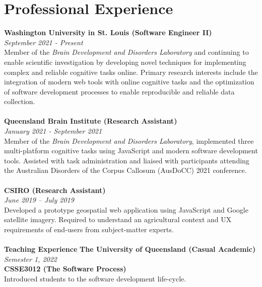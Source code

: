 \documentclass{article}
\begin{document}
  \section*{Professional Experience}
  \large\textbf{Washington University in St. Louis (Software Engineer II)} \\
  \textit{September 2021 - Present} \\
  Member of the \textit{Brain Development and Disorders Laboratory} and continuing to enable scientific investigation by developing novel techniques for implementing complex and reliable cognitive tasks online. Primary research interests include the integration of modern web tools with online cognitive tasks and the optimization of software development processes to enable reproducible and reliable data collection. \\ 
  \\

  \large\textbf{Queensland Brain Institute (Research Assistant)} \\
  \textit{January 2021 - September 2021} \\
  Member of the \textit{Brain Development and Disorders Laboratory}, implemented three multi-platform cognitive tasks using JavaScript and modern software development tools. Assisted with task administration and liaised with participants attending the Australian Disorders of the Corpus Callosum (AusDoCC) 2021 conference. \\ 
  \\

  \large\textbf{CSIRO (Research Assistant)} \\
  \textit{June 2019 – July 2019} \\
  Developed a prototype geospatial web application using JavaScript and Google satellite imagery. Required to understand an agricultural context and UX requirements of end-users from subject-matter experts. \\
  \\

  \large\textbf{Teaching Experience}
  \large\textbf{The University of Queensland (Casual Academic)} \\
  \textit{Semester 1, 2022} \\
  \textbf{CSSE3012 (The Software Process)} \\
  Introduced students to the software development life-cycle. \\
  \\
\end{document}
